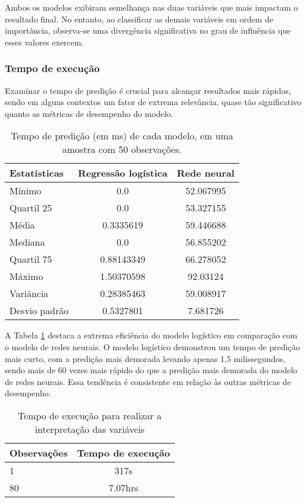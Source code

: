  Ambos os modelos exibiram semelhança nas duas variáveis que mais impactam o resultado final.
  No entanto, ao classificar as demais variáveis em ordem de importância,
  observa-se uma divergência significativa no grau de influência que esses valores exercem.

\subsubsection{Tempo de execução}


Examinar o tempo de predição é crucial para alcançar resultados mais rápidos, 
sendo em alguns contextos um fator de extrema relevância, quase tão significativo
 quanto as métricas de desempenho do modelo.

\begin{table}[H]
\centering
\begin{tabular}{lcc}
  \hline
  \textbf{Estatísticas} & \textbf{Regressão logística} & \textbf{Rede neural} \\
  \hline
  Mínimo & 0.0 & 52.067995 \\
  Quartil 25 & 0.0 & 53.327155 \\
  Média & 0.3335619 & 59.446688 \\
  Mediana & 0.0 & 56.855202 \\
  Quartil 75 & 0.88143349 & 66.278052 \\
  Máximo & 1.50370598 & 92.03124 \\
  Variância & 0.28385463 & 59.008917 \\
  Desvio padrão & 0.5327801 & 7.681726 \\
  \hline
\end{tabular}
\caption{Tempo de predição (em ms) de cada modelo, em uma amostra com 50 observações. }
\label{tab:bench_models}
\end{table}

A Tabela \ref{tab:bench_models} destaca a extrema eficiência do modelo logístico
 em comparação com o modelo de redes neurais. O modelo logístico demonstrou um tempo 
 de predição mais curto, com a predição mais demorada levando apenas 1,5 milissegundos,
  sendo mais de 60 vezes mais rápido do que a predição mais demorada do modelo de redes neurais.
   Essa tendência é consistente em relação às outras métricas de desempenho.

\begin{table}[H]
\centering
\begin{tabular}{lc}
\hline
\textbf{Observações} & \textbf{Tempo de execução} \\
\hline
1  & 317s \\
80 & 7.07hrs \\
\hline
\end{tabular}
\caption{Tempo de execução para realizar a interpretação das variáveis}
\label{tab:tempo_execucao_shap}
\end{table}
\newpage


